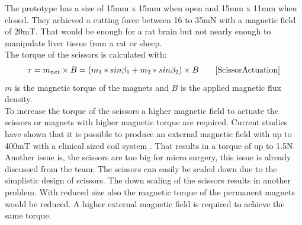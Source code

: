 \newpage
The prototype has a size of 15mm x 15mm when open and 15mm x 11mm when closed. They achieved a cutting force between 16 to 35mN with a magnetic field of 20mT. That would be enough for a rat brain but not nearly enough to manipulate liver tissue from a rat or sheep.\\
The torque of the scissors is calculated with: 
\begin{align*}
    \tau = m_{net} \times B = (m_1 * sin \beta_1 + m_2 * sin \beta_2) \times B \qquad \cite{ScissorActuation}
\end{align*}
$m$ is the magnetic torque of the magnets and $B$ is the applied magnetic flux density. \\
To increase the torque of the scissors a higher magnetic field to actuate the scissors or magnets with higher magnetic torque are required. Current studies have shown that it is possible to produce an external magnetic field with up to 400mT with a clinical sized coil system \cite{MagneticField}. That results in a torque of up to 1.5N. \\
Another issue is, the scissors are too big for micro surgery, this issue is already discussed from the team: \grqq The scissors can easily be scaled down \grqq \cite{ScissorActuation} due to the simplistic design of scissors. The down scaling of the scissors results in another problem. With reduced size also the magnetic torque of the permanent magnets would be reduced. A higher external magnetic field is required to achieve the same torque.

